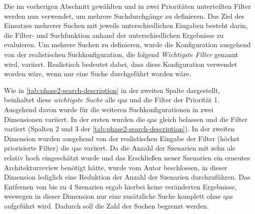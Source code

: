 Die im vorherigen Abschnitt gewählten und in zwei Prioritäten unterteilten Filter werden nun verwendet, um mehrere Suchdurchgänge zu definieren.
Das Ziel des Einsatzes mehrerer Suchen mit jeweils unterschiedlichen Eingaben besteht darin, die Filter- und Suchfunktion anhand der unterschiedlichen Ergebnisse zu evaluieren.
Um mehrere Suchen zu definieren, wurde die Konfiguration ausgehend von der realistischen Suchkonfiguration, die folgend \emph{Wichtigste Filter} genannt wird, variiert.
Realistisch bedeutet dabei, dass diese Konfiguration verwendet worden wäre, wenn nur eine Suche durchgeführt worden wäre.

Wie in \cref{tab:phase2-search-description} in der zweiten Spalte dargestellt, beinhaltet diese \emph{wichtigste Suche} alle \glspl{qa} und die Filter der Priorität 1.
Ausgehend davon wurde für die weiteren Suchkonfigurationen in zwei Dimensionen variiert.
In der ersten wurden die \glspl{qa} gleich belassen und die Filter variiert (Spalten 2 und 3 der \cref{tab:phase2-search-description}).
In der zweiten Dimension wurden ausgehend von der realistischen Eingabe der Filter (höchst priorisierte Filter) die \glspl{qa} variiert.
Da die Anzahl der Szenarien mit zehn als relativ hoch eingeschätzt wurde und das Erschließen neuer Szenarien ein erneutes Architekturreview benötigt hätte, wurde vom Autor beschlossen, in dieser Dimension lediglich eine Reduktion der Anzahl der Szenarien durchzuführen.
Das Entfernen von bis zu 4 Szenarien ergab hierbei keine veränderten Ergebnisse, weswegen in dieser Dimension nur eine zusätzliche Suche komplett ohne \glspl{qa} aufgeführt wird.
Dadurch soll die Zahl der Suchen begrenzt werden.


